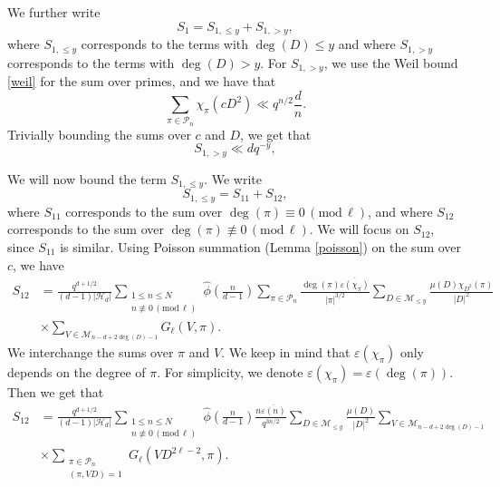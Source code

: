 \documentclass[12pt]{amsart}
\renewcommand{\pmod}[1]{\,(\mathrm{mod}\,#1)}
\begin{document}
  

 We further write 
 $$S_1=S_{1, \leq y}+S_{1,>y},$$ where $S_{1,\leq y}$ corresponds to the terms with $\deg(D) \leq y$ and where $S_{1,>y}$ corresponds to the terms with $\deg(D)>y$. 
 For $S_{1,>y}$, we use the Weil bound \eqref{weil} for the sum over primes, and we have that 
 $$ \sum_{\pi \in \mathcal{P}_n}  \chi_{\pi}(cD^2) \ll q^{n/2} \frac{d}{n}.$$
 Trivially bounding the sums over $c$ and $D$, we get that 
 \begin{equation}S_{1,>y} \ll d q^{-y},
 \label{s1>y}
 \end{equation}

We will now bound the term $S_{1, \leq y}$. 
We write 
\begin{equation}
\label{s1<y}
S_{1,\leq y} = S_{11}+S_{12},
\end{equation} where $S_{11}$ corresponds to the sum over $\deg(\pi) \equiv 0 \pmod{\ell}$, and where $S_{12}$ corresponds to the sum over $\deg(\pi) \not\equiv 0\pmod{\ell}$.  We will focus on $S_{12}$,   since $S_{11}$ is similar.  Using Poisson summation (Lemma \ref{poisson}) on the sum over $c$, we have
\begin{align*}
S_{12} &=  \frac{q^{d+1/2}}{(d-1)|\mathcal{H}_d|}  \sum_{\substack{ 1 \leq n\leq N \\ n \not \equiv 0 \pmod \ell}} \widehat{\phi}\left(\frac{n}{d-1}\right) \sum_{ \pi \in \mathcal{P}_{n}} \frac{\deg(\pi) \overline{\varepsilon(\chi_{\pi})}}{|\pi|^{3/2}} \sum_{D \in \mathcal{M}_{\leq y}} \frac{ \mu(D) \chi_{D^2}(\pi)}{|D|^2} \\
& \times \sum_{V \in \mathcal{M}_{n-d+2\deg(D)-1}} G_\ell(V,\pi).
\end{align*} 
We interchange the sums over $\pi$ and $V$. We keep in mind that $\varepsilon(\chi_{\pi})$ only depends on the degree of $\pi$.  For simplicity,  we denote $\varepsilon(\chi_{\pi})=\varepsilon(\deg(\pi))$.  Then we get that
\begin{align*}
S_{12} &= \frac{q^{d+1/2}}{(d-1)|\mathcal{H}_d|}  \sum_{\substack{ 1 \leq n\leq N \\ n \not \equiv 0 \pmod \ell}} \widehat{\phi}\left(\frac{n}{d-1}\right) \frac{n \overline{\varepsilon(n)}}{q^{3n/2}}\sum_{D \in \mathcal{M}_{\leq y}} \frac{ \mu(D)}{|D|^2}   \sum_{V \in \mathcal{M}_{n-d+2\deg(D)-1}} \\
& \times  \sum_{\substack{ \pi \in \mathcal{P}_{n} \\ (\pi, VD)=1}} G_\ell(VD^{2\ell-2},\pi).
\end{align*}
\end{document}
